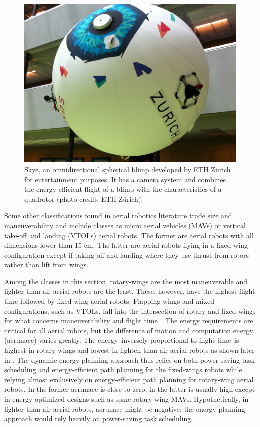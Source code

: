\begin{figure}[t]
  \centering
  \includegraphics[width=.7\textwidth]{pictures/IMG_2612}
  \caption[Skye, an omnidirectional spherical blimp]{Skye, an omnidirectional spherical blimp developed by ETH Z\"urich for entertainment purposes. It has a camera system and combines the energy-efficient flight of a blimp with the characteristics of a quadrotor {\scriptsize(photo credit: ETH Z\"urich)}.}   
  \label{fig:skye-blimp}
\end{figure}

Some other classifications found in aerial robotics literature trade size and maneuverability and include classes as micro aerial vehicles (MAVs) or vertical take-off and landing (VTOLs) aerial robots. The former are aerial robots with all dimensions lower than 15 cm. The latter are aerial robots flying in a fixed-wing configuration except if taking-off and landing where they use thrust from rotors rather than lift from wings. 

Among the classes in this section, rotary-wings are the most maneuverable and lighter-than-air aerial robots are the least. These, however, have the highest flight time followed by fixed-wing aerial robots. Flapping-wings and mixed configurations, such as VTOLs, fall into the intersection of rotary and fixed-wings for what concerns maneuverability and flight time~\citep{siciliano2016springer}. The energy requirements are critical for all aerial robots, but the difference of motion and computation energy (\Gls{acr:mace}) varies greatly. The energy--inversely proportional to flight time--is highest in rotary-wings and lowest in lighten-than-air aerial robots as shown later in . The dynamic energy planning approach thus relies on both power-saving task scheduling and energy-efficient path planning for the fixed-wings robots while relying almost exclusively on energy-efficient path planning for rotary-wing aerial robots. In the former \Gls{acr:mace} is close to zero, in the latter is usually high except in energy optimized designs such as some rotary-wing MAVs. Hypothetically, in lighter-than-air aerial robots, \Gls{acr:mace} might be negative; the energy planning approach would rely heavily on power-saving task scheduling.


